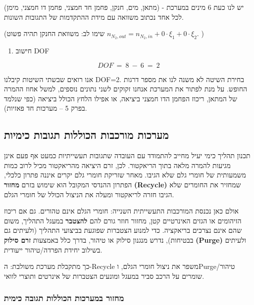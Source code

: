 \documentclass[
  hebrew,
  letterpaper,
  DIV=11,
  numbers=noendperiod]{scrreprt}
\providecommand{\tightlist}{%
  \setlength{\itemsep}{0pt}\setlength{\parskip}{0pt}}
\begin{document}
יש לנו כעת 6 מינים במערכת - (מתאן, מים, חנקן, פחמן חד חמצני, פחמן דו
חמצני, מימן)\\
לכל אחד נכתוב משוואה עם מידת ההתקדמות של התגובות השונות.

(שימו לב: משוואת החנקן תהיה פשוט
\(n_{N_{2},out} = n_{N_{2},in} + 0 \cdot \xi_{1} + 0 \cdot \xi_{2}\). )

\begin{enumerate}
\def\labelenumi{\arabic{enumi}.}
\setcounter{enumi}{2}
\tightlist
\item
  חישוב DOF
\end{enumerate}

\[DOF\  = \ 8\  - \ 6\  = \ 2\]

אנו רואים שבשתי השיטות קיבלנו DOF=2. בחירת השיטה לא משנה לנו את מספר
דרגות החופש. על מנת לפתור את המערכת אנחנו זקוקים לשני נתונים נוספים,
למשל אחוז ההמרה של המתאן, ריכוז הפחמן הדו חמצני ביציאה, או אפילו הלחץ
הכולל ביציאה (כפי שנלמד בפרק 5 -- מערכות חד פאזיות).

\subsection{מערכות מורכבות הכוללות תגובות
כימיות}\label{ux5deux5e2ux5e8ux5dbux5d5ux5ea-ux5deux5d5ux5e8ux5dbux5d1ux5d5ux5ea-ux5d4ux5dbux5d5ux5dcux5dcux5d5ux5ea-ux5eaux5d2ux5d5ux5d1ux5d5ux5ea-ux5dbux5d9ux5deux5d9ux5d5ux5ea}

תכנון תהליך כימי יעיל מחייב להתמודד עם העובדה שתגובות תעשייתיות כמעט אף
פעם אינן מגיעות להמרה מלאה בתוך הריאקטור. לכן, זרם היציאה מהריאקטור מכיל
לרוב כמות משמעותית של חומרי גלם שלא הגיבו. מאחר שזריקת חומרי גלם יקרים
איננה פתרון כלכלי, הפתרון ההנדסי המקובל הוא שימוש בזרם \textbf{מחזור}
\textbf{(Recycle)} שמחזיר את החומרים שלא הגיבו חזרה לריאקטור ומעלה את
הניצול הכולל של חומרי הגלם.

אולם כאן נכנסת המורכבות התעשייתית השנייה: חומרי הגלם אינם טהורים. גם אם
ריכוז הזיהומים או הגזים האינרטיים קטן, מחזור חוזר גורם להם
\textbf{להצטבר} במעגל התהליך, משום שהם אינם נצרכים בריאקציה. כדי למנוע
הצטברות שפוגעת בביצועי התהליך (ולעיתים גם בבטיחות), נדרש מנגנון סילוק או
טיהור, בדרך כלל באמצעות \textbf{זרם סילוק} \textbf{(Purge)} ולעיתים
בשילוב יחידת הפרדה/טיהור ייעודית.

כך מתקבלת מערכת משולבת: ה-Recycle משפר את ניצול חומרי הגלם, וPurge/טיהור
שומרים על הרכב סביר במעגל ומונעים הצטברות של אינרטים ותוצרי לוואי.

\subsubsection{מחזור במערכות הכוללות תגובה
כימית}\label{ux5deux5d7ux5d6ux5d5ux5e8-ux5d1ux5deux5e2ux5e8ux5dbux5d5ux5ea-ux5d4ux5dbux5d5ux5dcux5dcux5d5ux5ea-ux5eaux5d2ux5d5ux5d1ux5d4-ux5dbux5d9ux5deux5d9ux5ea}
\end{document}
